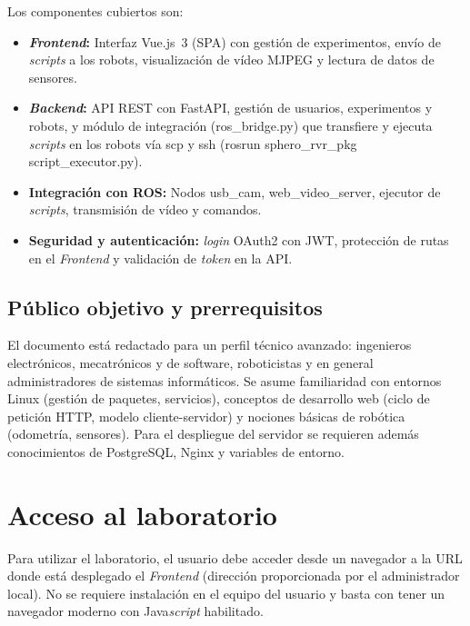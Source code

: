 \documentclass[12pt]{article}
\numberwithin{figure}{section}
\numberwithin{table}{section}
\def\code#1{#1}%
\def\file#1{#1}%
\newcommand{\code}[1]{\textcolor{codeblue}{\url{#1}}}
\newcommand{\file}[1]{\textcolor{darkblue}{\texttt{#1}}}
\begin{document}
Los componentes cubiertos son:

\begin{itemize}
    \item \textbf{\textit{Frontend}:} Interfaz Vue.js~3 (SPA) con gestión de experimentos, envío de \textit{scripts} a los robots, visualización de vídeo MJPEG y lectura de datos de sensores.
    \item \textbf{\textit{Backend}:} API REST con FastAPI, gestión de usuarios, experimentos y robots, y módulo de integración (\file{ros\_bridge.py}) que transfiere y ejecuta \textit{scripts} en los robots vía \code{scp} y \code{ssh} (\code{rosrun sphero\_rvr\_pkg script\_executor.py}).
    \item \textbf{Integración con ROS:} Nodos \code{usb\_cam}, \code{web\_video\_server}, ejecutor de \textit{scripts}, transmisión de vídeo y comandos.
    \item \textbf{Seguridad y autenticación:} \textit{login} OAuth2 con JWT, protección de rutas en el \textit{Frontend} y validación de \textit{token} en la API.
\end{itemize}


\subsection{Público objetivo y prerrequisitos}
El documento está redactado para un perfil técnico avanzado: ingenieros electrónicos, mecatrónicos y de software, roboticistas y en general administradores de sistemas informáticos. Se asume familiaridad con entornos Linux (gestión de paquetes, servicios), conceptos de desarrollo web (ciclo de petición HTTP, modelo cliente-servidor) y nociones básicas de robótica (odometría, sensores). Para el despliegue del servidor se requieren además conocimientos de PostgreSQL, Nginx y variables de entorno.


\section{Acceso al laboratorio}
\justifying

Para utilizar el laboratorio, el usuario debe acceder desde un navegador a la URL donde está desplegado el \textit{Frontend} (dirección proporcionada por el administrador local). No se requiere instalación en el equipo del usuario y basta con tener un navegador moderno con Java\textit{script} habilitado.
\end{document}
